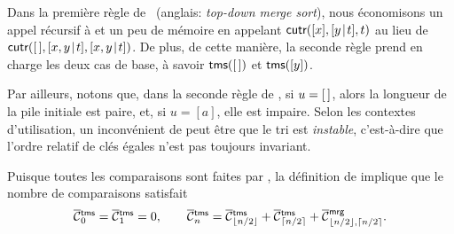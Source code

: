 Dans la première règle de~ (anglais: \emph{top-down merge
  sort}), nous économisons un appel récursif à  et un peu
de mémoire en appelant \(\textsf{cutr}([x],[{y}\!\mid\!{t}], t)\) au lieu de
\(\textsf{cutr}([\,],[{x,y}\!\mid\!{t}],[{x,y}\!\mid\!{t}])\). De plus, de cette
manière, la seconde règle prend en charge les deux cas de base, à
savoir \(\textsf{tms}([\,])\) et \(\textsf{tms}([y])\).

Par ailleurs, notons que, dans la seconde règle de , si
\(u = [\,]\), alors la longueur de la pile initiale est paire, et, si
\(u = [a]\), elle est impaire. Selon les contextes d'utilisation, un
inconvénient de  peut être que le
tri est \emph{instable}, c'est-à-dire que l'ordre relatif de clés
égales n'est pas toujours invariant.

Puisque toutes les comparaisons sont faites par
, la définition de
 implique que le nombre de
comparaisons satisfait
\begin{equation}
\OC{\fun{tms}}{0} = \OC{\fun{tms}}{1} = 0,
\qquad
\OC{\fun{tms}}{n} = \OC{\fun{tms}}{\floor{n/2}}
+ \OC{\fun{tms}}{\ceiling{n/2}}
+ \OC{\fun{mrg}}{\floor{n/2},\ceiling{n/2}}.
\index{tms@$\OC{\fun{tms}}{n}$}
\label{eq:cost_tms}
\end{equation}



